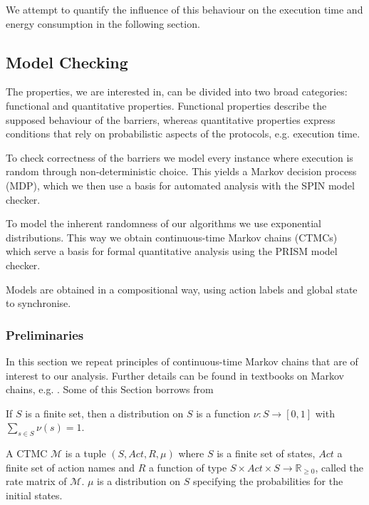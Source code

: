 \documentclass[a4paper, 10pt]{article}
\begin{document}
We attempt to quantify the influence of this behaviour on the execution time and energy consumption in the following section.

\subsection{Model Checking}
\label{ssec:analysis-modelchecking}
The properties, we are interested in, can be divided into two broad categories: functional and quantitative properties. Functional properties describe the supposed behaviour of the barriers, whereas quantitative properties express conditions that rely on probabilistic aspects of the protocols, e.g. execution time.

To check correctness of the barriers we model every instance where execution is random through non-deterministic choice. This yields a Markov decision process (MDP), which we then use a basis for automated analysis with the SPIN model checker.

To model the inherent randomness of our algorithms we use exponential distributions. This way we obtain continuous-time Markov chains (CTMCs) which serve a basis for formal quantitative analysis using the PRISM model checker.

Models are obtained in a compositional way, using action labels and global state to synchronise.

\subsubsection{Preliminaries}
\label{sssec:analysis-modelchecking-preliminaries}
In this section we repeat principles of continuous-time Markov chains that are of interest to our analysis. Further details can be found in textbooks on Markov chains, e.g. \cite{kul95, ks76}. Some of this Section borrows from \cite{bai13}

If $S$ is a finite set, then a distribution on $S$ is a function $\nu:S \rightarrow [0,1]$ with $\sum\limits_{s \in S} \nu (s) = 1$.

A CTMC $\mathcal{M}$ is a tuple $(S, \mathit{Act}, R, \mu)$ where $S$ is a finite set of states, $Act$ a finite set of action names and $R$ a function of type $S \times \mathit{Act} \times S \rightarrow \mathbb{R}_{\ge 0}$, called the rate matrix of $\mathcal{M}$. $\mu$ is a distribution on $S$ specifying the probabilities for the initial states.
\end{document}
